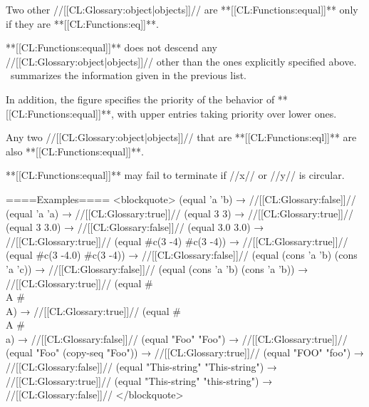 
Two other //[[CL:Glossary:object|objects]]// are **[[CL:Functions:equal]]** only if they are **[[CL:Functions:eq]]**.

\endlist

**[[CL:Functions:equal]]** does not descend any //[[CL:Glossary:object|objects]]// other than the ones explicitly specified above. \Thenextfigure\ summarizes the information given in the previous list.

In addition, the figure specifies the priority of the behavior of **[[CL:Functions:equal]]**, with upper entries taking priority over lower ones.


Any two //[[CL:Glossary:object|objects]]// that are **[[CL:Functions:eql]]** are also **[[CL:Functions:equal]]**.

**[[CL:Functions:equal]]** may fail to terminate if //x// or //y// is circular.

====Examples====
<blockquote> (equal 'a 'b) → //[[CL:Glossary:false]]// (equal 'a 'a) → //[[CL:Glossary:true]]// (equal 3 3) → //[[CL:Glossary:true]]// (equal 3 3.0) → //[[CL:Glossary:false]]// (equal 3.0 3.0) → //[[CL:Glossary:true]]// (equal #c(3 -4) #c(3 -4)) → //[[CL:Glossary:true]]// (equal #c(3 -4.0) #c(3 -4)) → //[[CL:Glossary:false]]// (equal (cons 'a 'b) (cons 'a 'c)) → //[[CL:Glossary:false]]// (equal (cons 'a 'b) (cons 'a 'b)) → //[[CL:Glossary:true]]// (equal #\\A #\\A) → //[[CL:Glossary:true]]// (equal #\\A #\\a) → //[[CL:Glossary:false]]// (equal "Foo" "Foo") → //[[CL:Glossary:true]]// (equal "Foo" (copy-seq "Foo")) → //[[CL:Glossary:true]]// (equal "FOO" "foo") → //[[CL:Glossary:false]]// (equal "This-string" "This-string") → //[[CL:Glossary:true]]// (equal "This-string" "this-string") → //[[CL:Glossary:false]]// </blockquote>

